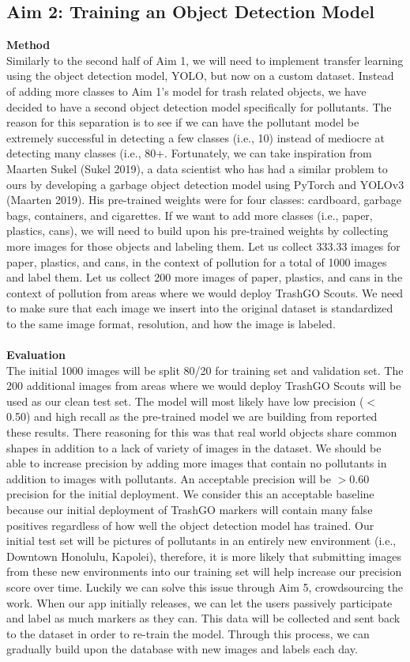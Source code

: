\documentclass[
  journal=small,
  manuscript=article-type,  %
  year=2022,
  volume=1,
]{cup-journal}
\begin{document}
\subsection{Aim 2: Training an Object Detection Model}
\textbf{Method}\\
Similarly to the second half of Aim 1, we will need to implement transfer learning using the object detection model, YOLO, but now on a custom dataset. Instead of adding more classes to Aim 1's model for trash related objects, we have decided to have a second object detection model specifically for pollutants. The reason for this separation is to see if we can have the pollutant model be extremely successful in detecting a few classes (i.e., 10) instead of mediocre at detecting many classes (i.e., 80+. Fortunately, we can take inspiration from Maarten Sukel (Sukel 2019), a data scientist who has had a similar problem to ours by developing a garbage object detection model using PyTorch and YOLOv3 (Maarten 2019). His pre-trained weights were for four classes: cardboard, garbage bags, containers, and cigarettes. If we want to add more classes (i.e., paper, plastics, cans), we will need to build upon his pre-trained weights by collecting more images for those objects and labeling them. Let us collect 333.33 images for paper, plastics, and cans, in the context of pollution for a total of 1000 images and label them. Let us collect 200 more images of paper, plastics, and cans in the context of pollution from areas where we would deploy TrashGO Scouts. We need to make sure that each image we insert into the original dataset is standardized to the same image format, resolution, and how the image is labeled. 
\\\\\textbf{Evaluation}\\
The initial 1000 images will be split 80/20 for training set and validation set. The 200 additional images from areas where we would deploy TrashGO Scouts will be used as our clean test set. The model will most likely have low precision ($<$ 0.50) and high recall as the pre-trained model we are building from reported these results. There reasoning for this was that real world objects share common shapes in addition to a lack of variety of images in the dataset. We should be able to increase precision by adding more images that contain no pollutants in addition to images with pollutants. An acceptable precision will be $> 0.60$ precision for the initial deployment. We consider this an acceptable baseline because our initial deployment of TrashGO markers will contain many false positives regardless of how well the object detection model has trained. Our initial test set will be pictures of pollutants in an entirely new environment (i.e., Downtown Honolulu, Kapolei), therefore, it is more likely that submitting images from these new environments into our training set will help increase our precision score over time. Luckily we can solve this issue through Aim 5, crowdsourcing the work. When our app initially releases, we can let the users passively participate and label as much markers as they can. This data will be collected and sent back to the dataset in order to re-train the model. Through this process, we can gradually build upon the database with new images and labels each day. 
\end{document}
